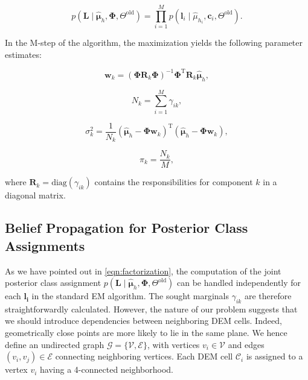 \begin{equation}
\label{eqn:factorization}
p(\mathbf{L}\mid\hat{\boldsymbol\mu}_h,\boldsymbol{\Phi},\Theta^\text{old})
=\prod_{i=1}^M p(\mathbf{l}_i\mid\hat{\mu}_{h_i},\mathbf{c}_i,
\Theta^\text{old}).
\end{equation}

In the M-step of the algorithm, the maximization yields the following parameter
estimates:

\begin{equation}
\label{eqn:coeff}
\mathbf{w}_k = (\boldsymbol{\Phi}\mathbf{R}_k\boldsymbol{\Phi})^{-1}
\boldsymbol{\Phi}^\text{T}\mathbf{R}_k\hat{\boldsymbol\mu}_h,
\end{equation}

\begin{equation}
\label{eqn:numpoints}
N_k = \sum_{i=1}^M\gamma_{ik},
\end{equation}

\begin{equation}
\label{eqn:var}
\sigma^2_k = \frac{1}{N_k}(\hat{\boldsymbol\mu}_h-\boldsymbol{\Phi}
\mathbf{w}_k)^\text{T}(\hat{\boldsymbol\mu}_h-\boldsymbol{\Phi}\mathbf{w}_k),
\end{equation}

\begin{equation}
\label{eqn:weights}
\pi_k = \frac{N_k}{M},
\end{equation}

where $\mathbf{R}_k=\text{diag}(\gamma_{ik})$ contains the responsibilities for
component $k$ in a diagonal matrix.

\subsection{Belief Propagation for Posterior Class Assignments}
As we have pointed out in \eqref{eqn:factorization}, the computation of the
joint posterior class assignment
$p(\mathbf{L}\mid\hat{\boldsymbol\mu}_h,\boldsymbol{\Phi},\Theta^\text{old})$
can be handled independently for each $\mathbf{l_i}$ in the standard EM
algorithm. The sought marginals $\gamma_{ik}$ are therefore straightforwardly
calculated. However, the nature of our problem suggests that we should introduce
dependencies between neighboring DEM cells. Indeed, geometrically close points
are more likely to lie in the same plane. We hence define an undirected graph
$\mathcal{G}=\{\mathcal{V},\mathcal{E}\}$, with vertices $v_i\in\mathcal{V}$ and
edges $(v_i,v_j)\in\mathcal{E}$ connecting neighboring vertices. Each DEM cell
$\mathcal{C}_i$ is assigned to a vertex $v_i$ having a 4-connected neighborhood.

